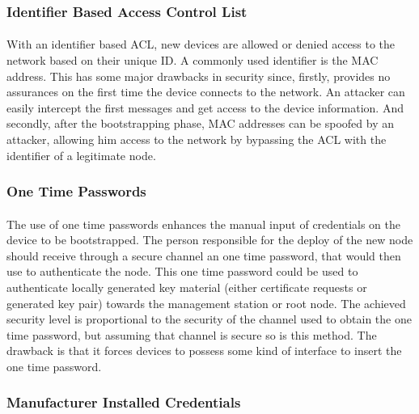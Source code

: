 \subsubsection{Identifier Based Access Control List}
\paragraph{}
With an identifier based \ac{ACL}, new devices are allowed or denied access to the network based on their unique ID. A commonly used identifier is the MAC address. This has some major drawbacks in security since, firstly, provides no assurances on the first time the device connects to the network. An attacker can easily intercept the first messages and get access to the device information. And secondly, after the bootstrapping phase, MAC addresses can be spoofed by an attacker, allowing him access to the network by bypassing the \ac{ACL} with the identifier of a legitimate node.

\subsubsection{One Time Passwords}
\paragraph{}
The use of one time passwords enhances the manual input of credentials on the device to be bootstrapped. The person responsible for the deploy of the new node should receive through a secure channel an one time password, that would then use to authenticate the node. This one time password could be used to authenticate locally generated key material (either certificate requests or generated key pair) towards the management station or root node. The achieved security level is proportional to the security of the channel used to obtain the one time password, but assuming that channel is secure so is this method. The drawback is that it forces devices to possess some kind of interface to insert the one time password.

\subsubsection{Manufacturer Installed Credentials}

